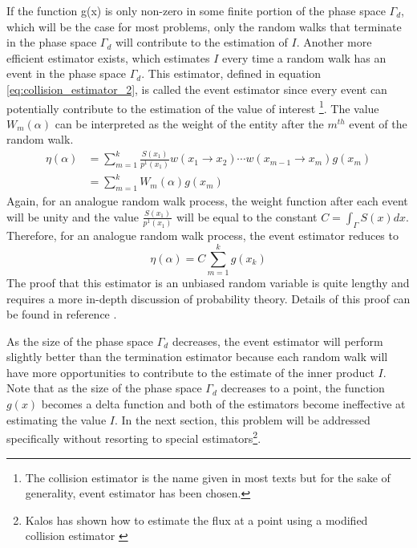 If the function g(x) is only non-zero in some finite portion of the phase space
$\Gamma_d$, which will be the case for most problems, only the random walks 
that terminate in the phase space $\Gamma_d$ will contribute to the 
estimation of $I$. Another more efficient estimator exists, which estimates $I$
every time a random walk has an event in the phase space $\Gamma_d$. This 
estimator, defined in equation \ref{eq:collision_estimator_2}, is called the 
event estimator since every event can potentially contribute to the estimation 
of the value of interest \footnote{The collision estimator is the name given
in most texts but for the sake of generality, event estimator has been 
chosen.}. The value $W_m(\alpha)$ can be interpreted as the weight of the 
entity after the $m^{th}$ event of the random walk.
\begin{align}
  \eta(\alpha) & = \sum_{m=1}^k \frac{S(x_1)}{p^1(x_1)}w(x_1 \to x_2) \cdots 
  w(x_{m-1} \to x_m) g(x_m) \nonumber \\
  & = \sum_{m=1}^k W_m(\alpha) g(x_m)
  \label{eq:collision_estimator_2}
\end{align}
Again, for an analogue random walk process, the weight function after each 
event will be unity and the value $\frac{S(x_1)}{p^1(x_1)}$ will be equal to 
the constant $C = \int_{\Gamma} S(x)dx$. Therefore, for an analogue random walk 
process, the event estimator reduces to
\begin{equation*}
  \eta(\alpha) = C \sum_{m=1}^k g(x_k)
\end{equation*}
The proof that this estimator is an unbiased random variable is quite lengthy 
and requires a more in-depth discussion of probability theory. Details of this
proof can be found in reference \cite{spanier_monte_1969}. 

As the size of the phase space $\Gamma_d$ decreases, the event estimator 
will perform slightly better than the termination estimator because each random
walk will have more opportunities to contribute to the estimate of the inner 
product $I$. Note that as the size of the phase space $\Gamma_d$ decreases to a 
point, the function $g(x)$ becomes a delta function and both of the estimators 
become ineffective at estimating the value $I$. In the next section, this 
problem will be addressed specifically without resorting to special estimators\footnote{Kalos has shown how to estimate the flux at a point using a modified
collision estimator \citep{kalos_estimation_1963}}.


